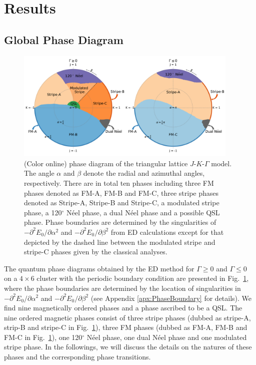 \documentclass[aps,prb,reprint,amsfonts,amsmath,amssymb,showpacs,groupedaddress,superscriptaddress]{revtex4-1}
\begin{document}
\section{\label{sec:Results}Results}

\subsection{\label{subsec:GlobalPhaseDiagram}Global Phase Diagram}

\begin{figure}
    \centering
    \includegraphics[width=0.95\textwidth]{fig/QuantumGlobalPhaseDiagram.pdf}
    \caption{\label{fig:QuantumPhaseDiagram}(Color online)  phase diagram of the triangular lattice $J$-$K$-$\Gamma$ model. The angle $\alpha$ and $\beta$ denote the radial and azimuthal angles, respectively. There are in total ten phases including three FM phases denoted as FM-A, FM-B and FM-C, three stripe phases denoted as Stripe-A, Stripe-B and Stripe-C, a modulated stripe phase, a 120$^\circ$ N\'{e}el phase, a dual N\'{e}el phase and a possible QSL phase. Phase boundaries are determined by the singularities of $-\partial^2E_0/\partial\alpha^2$ and $-\partial^2E_0/\partial\beta^2$ from ED calculations except for that depicted by the dashed line between the modulated stripe and stripe-C phases given by the classical analyses.}
\end{figure}

The  quantum phase diagrams obtained by the ED method for $\Gamma \geq 0$ and $\Gamma \leq 0$ on a $4 \times 6$ cluster with the periodic boundary condition are presented in Fig.~\ref{fig:QuantumPhaseDiagram}, where the phase boundaries are determined by the location of singularities in $-\partial^2E_0/\partial\alpha^2$ and $-\partial^2E_0/\partial\beta^2$ (see Appendix \ref{apx:PhaseBoundary} for details). We find nine magnetically ordered phases and a phase ascribed to be a QSL. The nine ordered magnetic phases consist of three stripe phases (dubbed as stripe-A, strip-B and stripe-C in Fig.~\ref{fig:QuantumPhaseDiagram}), three FM phases (dubbed as FM-A, FM-B and FM-C in Fig.~\ref{fig:QuantumPhaseDiagram}), one 120$^\circ$ N\'{e}el phase, one dual N\'{e}el phase and one modulated stripe phase. In the followings, we will discuss the details on the natures of these phases and the corresponding phase transitions.
\end{document}
